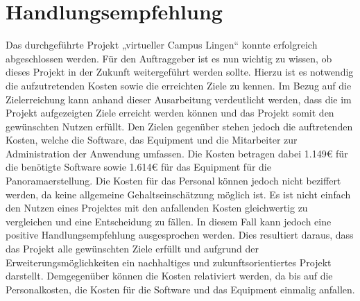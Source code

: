 \section{Handlungsempfehlung}
\label{sec:Handlungsempfehlung}

Das durchgeführte Projekt „virtueller Campus Lingen“ konnte erfolgreich abgeschlossen werden. 
Für den Auftraggeber ist es nun wichtig zu wissen, ob dieses Projekt in der Zukunft 
weitergeführt werden sollte. Hierzu ist es notwendig die aufzutretenden Kosten sowie die 
erreichten Ziele zu kennen. Im Bezug auf die Zielerreichung kann anhand dieser Ausarbeitung 
verdeutlicht werden, dass die im Projekt aufgezeigten Ziele erreicht werden können und das 
Projekt somit den gewünschten Nutzen erfüllt.  Den Zielen gegenüber stehen jedoch die auftretenden 
Kosten, welche die Software, das Equipment und die Mitarbeiter zur Administration der Anwendung umfassen. 
Die Kosten betragen dabei 1.149€ für die benötigte Software sowie 1.614€ für das Equipment für 
die Panoramaerstellung. Die Kosten für das Personal können jedoch nicht beziffert werden, 
da keine allgemeine Gehaltseinschätzung möglich ist.
Es ist nicht einfach den Nutzen eines Projektes mit den anfallenden Kosten gleichwertig zu 
vergleichen und eine Entscheidung zu fällen. In diesem Fall kann jedoch eine positive 
Handlungsempfehlung ausgesprochen werden. Dies resultiert daraus, dass das Projekt alle 
gewünschten Ziele erfüllt und aufgrund der Erweiterungsmöglichkeiten ein nachhaltiges und 
zukunftsorientiertes Projekt darstellt. Demgegenüber können die Kosten relativiert werden, 
da bis auf die Personalkosten, die Kosten für die Software und das Equipment einmalig anfallen.
